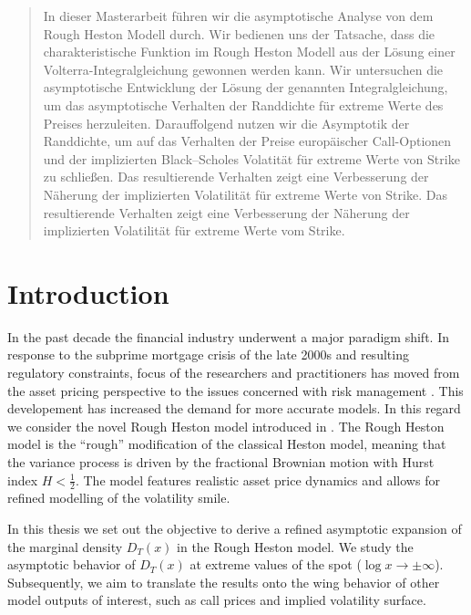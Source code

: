 \documentclass[12pt,twoside]{article}
\theoremstyle{plain}
\renewcommand{\baselinestretch}{1.2}
\theoremstyle{plain}
\theoremstyle{definition}
\theoremstyle{remark}
\numberwithin{equation}{section}
\begin{document}
\newpage\null\thispagestyle{empty}\newpage

\renewcommand{\baselinestretch}{1.0}\normalsize
\tableofcontents
\renewcommand{\baselinestretch}{1.2}\normalsize

\newpage

\renewcommand{\abstractname}{Zusammenfassung}

\begin{abstract}
    In dieser Masterarbeit führen wir die asymptotische Analyse von dem Rough Heston Modell durch. Wir bedienen uns der Tatsache, dass die charakteristische Funktion im Rough Heston Modell aus der Lösung einer Volterra-Integralgleichung gewonnen werden kann. Wir untersuchen die asymptotische Entwicklung der Lösung der genannten Integralgleichung, um das asymptotische Verhalten der Randdichte für extreme Werte des Preises herzuleiten. Darauffolgend nutzen wir die Asymptotik der Randdichte, um auf das Verhalten der Preise europäischer Call-Optionen und der implizierten Black–Scholes Volatität für extreme Werte von Strike zu schließen. Das resultierende Verhalten zeigt eine Verbesserung der Näherung der implizierten Volatilität für extreme Werte von Strike. Das resultierende Verhalten zeigt eine Verbesserung der Näherung der implizierten Volatilität für extreme Werte vom Strike.
\end{abstract}

\newpage

\setcounter{page}{1}

\section{Introduction}

In the past decade the financial industry underwent a major paradigm shift. In response to the subprime mortgage crisis of the late 2000s and resulting regulatory constraints, focus of the researchers and practitioners has moved from the asset pricing perspective to the issues concerned with risk management \cite{BW14}. This developement has increased the demand for more accurate models. In this regard we consider the novel Rough Heston model introduced in \cite{ER16}. The Rough Heston model is the ``rough'' modification of the classical Heston model, meaning that the variance process is driven by the fractional Brownian motion with Hurst index $H<\frac 12$. The model features realistic asset price dynamics and allows for refined modelling of the volatility smile.

In this thesis we set out the objective to derive a refined asymptotic expansion of the marginal density $D_T(x)$ in the Rough Heston model. We study the asymptotic behavior of $D_T(x)$ at extreme values of the spot ($\log x \rightarrow \pm \infty$). Subsequently, we aim to translate the results onto the wing behavior of other model outputs of interest, such as call prices and implied volatility surface.
\end{document}
